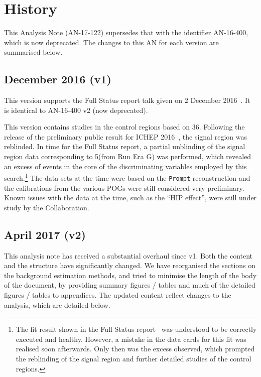 
\section{History}
\label{sec:history}

This Analysis Note (AN-17-122) supersedes that with the identifier
AN-16-400, which is now deprecated. The changes to this AN for each
version are summarised below.

\subsection{December 2016 (v1)}

This version supports the Full Status report talk given on
2 December 2016~\cite{fullstatus}. It is identical to
AN-16-400 v2 (now deprecated).

This version contains studies in the control regions based on
36\fbinv. Following the release of the preliminary public result for
ICHEP 2016~\cite{CMS-PAS-SUS-16-016}, the signal region was
reblinded. In time for the Full Status report, a partial unblinding of
the signal region data corresponding to 5\fbinv (from Run Era G) was
performed, which revealed an excess of events in the core of the
discriminating variables employed by this search.\footnote{The fit
  result shown in the Full Status report~\cite{fullstatus} was
  understood to be correctly executed and healthy. However, a mistake
  in the data cards for this fit was realised soon afterwards. Only
  then was the excess observed, which prompted the reblinding of the
  signal region and further detailed studies of the control regions.}
The data sets at the time were based on the \verb!Prompt!
reconstruction and the calibrations from the various POGs were still
considered very preliminary. Known issues with the data at the time,
such as the ``HIP effect'', were still under study by the
Collaboration.

\subsection{April 2017 (v2)}

This analysis note has received a substantial overhaul since v1. Both
the content and the structure have significantly changed.  We have
reorganised the sections on the background estimation methods, and
tried to minimise the length of the body of the document, by providing
summary figures / tables and much of the detailed figures / tables to
appendices. The updated content reflect changes to the analysis, which
are detailed below.

